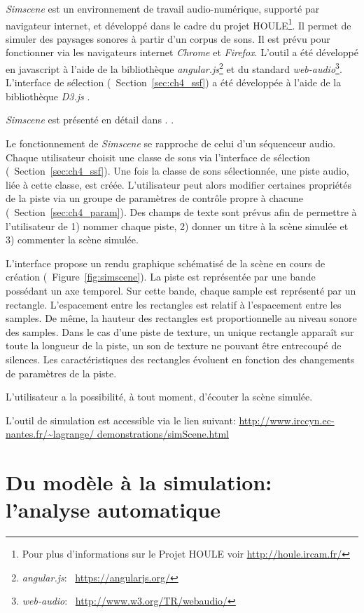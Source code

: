 \emph{Simscene} est un environnement de travail audio-numérique, supporté par navigateur internet, et développé dans le cadre du projet HOULE\footnote{Pour plus d’informations sur le Projet HOULE voir \url{http://houle.ircam.fr/}}. Il permet de simuler des paysages sonores à partir d'un corpus de sons. Il est prévu pour fonctionner via les navigateurs internet \emph{Chrome} et \emph{Firefox}. L'outil a été développé en javascript à l'aide de la bibliothèque \emph{angular.js}\footnote{\emph{angular.js}: \cf~\url{https://angularjs.org/}} et du standard \emph{web-audio}\footnote{\emph{web-audio}: \cf~\url{http://www.w3.org/TR/webaudio/}}. L'interface de sélection (\cf~Section~\ref{sec:ch4_ssf}) a été développée à l'aide de la bibliothèque \emph{D3.js} \citep{d32011}.

\emph{Simscene} est présenté en détail dans \citep{rossignol2015simscene}. . 

Le fonctionnement de \emph{Simscene} se rapproche de celui d'un séquenceur audio. Chaque utilisateur choisit une classe de sons via l'interface de sélection (\cf~Section~\ref{sec:ch4_ssf}). Une fois la classe de sons sélectionnée, une piste audio, liée à cette classe, est créée. L'utilisateur peut alors modifier certaines propriétés de la piste via un groupe de paramètres de contrôle propre à chacune (\cf~Section~\ref{sec:ch4_param}). Des champs de texte sont prévus afin de permettre à l'utilisateur de 1) nommer chaque piste, 2) donner un titre à la scène simulée et 3) commenter la scène simulée.

L'interface propose un rendu graphique schématisé de la scène en cours de création (\cf~Figure~\ref{fig:simscene}). La piste est représentée par une bande possédant un axe temporel. Sur cette bande, chaque sample est représenté par un rectangle. L'espacement entre les rectangles est relatif à l'espacement entre les samples. De même, la hauteur des rectangles est proportionnelle au niveau sonore des samples. Dans le cas d'une piste de texture, un unique rectangle apparaît sur toute la longueur de la piste, un son de texture ne pouvant être entrecoupé de silences. Les caractéristiques des rectangles évoluent en fonction des changements de paramètres de la piste.

L'utilisateur a la possibilité, à tout moment, d'écouter la scène simulée.

L'outil de simulation est accessible via le lien suivant: \url{http://www.irccyn.ec-nantes.fr/~lagrange/
demonstrations/simScene.html}

\section{Du modèle à la simulation: l'analyse automatique}
\label{sec:ch4_modAnaAuto}

